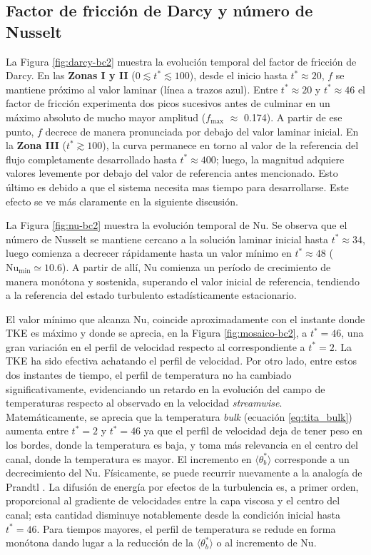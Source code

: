 \subsection{Factor de fricción de Darcy y número de Nusselt}
La Figura \ref{fig:darcy-bc2} muestra la evolución temporal del factor de fricción de Darcy. En las \textbf{Zonas I y II} ($0 \lesssim t^* \lesssim 100$), desde el inicio hasta $t^* \approx 20$, $f$ se mantiene próximo al valor laminar (línea a trazos azul). Entre $t^* \approx 20$ y $t^* \approx 46$ el factor de fricción experimenta dos picos sucesivos antes de culminar en un máximo absoluto de mucho mayor amplitud ($f_{\max}$ $\approx$ 0.174). A partir de ese punto, $f$ decrece de manera pronunciada por debajo del valor laminar inicial. En la \textbf{Zona III} ($t^* \gtrsim 100$), la curva permanece en torno al valor de la referencia del flujo completamente desarrollado hasta $t^* \approx 400$; luego, la magnitud adquiere valores levemente por debajo del valor de referencia antes mencionado. Esto último es debido a que el sistema necesita mas tiempo para desarrollarse. Este efecto se ve más claramente en la siguiente discusión.

La Figura \ref{fig:nu-bc2} muestra la evolución temporal de Nu. Se observa que el número de Nusselt se mantiene cercano a la solución laminar inicial hasta $t^* \approx 34$, luego comienza a decrecer rápidamente hasta un valor mínimo en $t^* \approx 48$ ($\text{Nu}_{\text{min}} \simeq 10\text{.}6$). A partir de allí, Nu comienza un período de crecimiento de manera monótona y sostenida, superando el valor inicial de referencia, tendiendo a la referencia del estado turbulento estadísticamente estacionario. 

El valor mínimo que alcanza Nu, coincide aproximadamente con el instante donde TKE es máximo y donde se aprecia, en la Figura \ref{fig:mosaico-bc2}, a $t^*=46$, una gran variación en el perfil de velocidad respecto al correspondiente a $t^*=2$. La TKE ha sido efectiva achatando el perfil de velocidad. Por otro lado, entre estos dos instantes de tiempo, el perfil de temperatura no ha cambiado significativamente, evidenciando un retardo en la evolución del campo de temperaturas respecto al observado en la velocidad \textit{streamwise}. Matemáticamente, se aprecia que la temperatura \textit{bulk} (ecuación \ref{eq:tita_bulk}) aumenta entre $t^*=2$ y $t^*=46$ ya que el perfil de velocidad deja de tener peso en los bordes, donde la temperatura es baja, y toma más relevancia en el centro del canal, donde la temperatura es mayor. El incremento en $\langle \theta^*_{b} \rangle$ corresponde a un decrecimiento del Nu. Físicamente, se puede recurrir nuevamente a la analogía de Prandtl \cite{aicher1997}. La difusión de energía por efectos de la turbulencia es, a primer orden, proporcional al gradiente de velocidades entre la capa viscosa y el centro del canal; esta cantidad  disminuye notablemente desde la condición inicial hasta $t^*=46$. Para tiempos mayores, el perfil de temperatura se redude en forma monótona dando lugar a la reducción de la $\langle \theta^*_{b} \rangle$ o al incremento de Nu.


